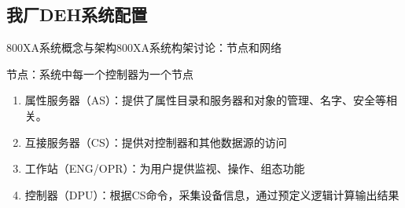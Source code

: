 \documentclass[12pt,hyperref={CJKbookmarks=true}]{beamer} %
\begin{document}
\subsection{我厂DEH系统配置}
\begin{frame}{800XA系统概念与架构}{800XA系统构架讨论：节点和网络}
		\begin{block}{节点：系统中每一个控制器为一个节点}
			\begin{enumerate}
				\item  属性服务器（AS）：提供了属性目录和服务器和对象的管理、名字、安全等相关。
				
				\item  互接服务器（CS）：提供对控制器和其他数据源的访问
				
				\item  工作站（ENG/OPR）：为用户提供监视、操作、组态功能
				
				\item  控制器（DPU）：根据CS命令，采集设备信息，通过预定义逻辑计算输出结果
			\end{enumerate}
		\end{block}
\end{frame}
\end{document}
